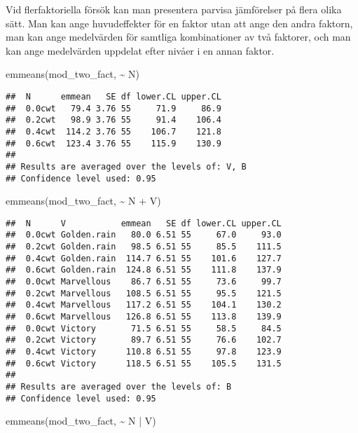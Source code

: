 \documentclass[
]{book}
\newenvironment{Shaded}{\begin{snugshade}}{\end{snugshade}}
\newcommand{\FunctionTok}[1]{\textcolor[rgb]{0.00,0.00,0.00}{#1}}
\newcommand{\NormalTok}[1]{#1}
\newcommand{\SpecialCharTok}[1]{\textcolor[rgb]{0.00,0.00,0.00}{#1}}
\theoremstyle{definition}
\theoremstyle{definition}
\theoremstyle{definition}
\theoremstyle{definition}
\theoremstyle{remark}
\begin{document}
Vid flerfaktoriella försök kan man presentera parvisa jämförelser på flera olika sätt. Man kan ange huvudeffekter för en faktor utan att ange den andra faktorn, man kan ange medelvärden för samtliga kombinationer av två faktorer, och man kan ange medelvärden uppdelat efter nivåer i en annan faktor.

\begin{Shaded}
\begin{Highlighting}[]
\FunctionTok{emmeans}\NormalTok{(mod\_two\_fact, }\SpecialCharTok{\textasciitilde{}}\NormalTok{ N)}
\end{Highlighting}
\end{Shaded}

\begin{verbatim}
##  N      emmean   SE df lower.CL upper.CL
##  0.0cwt   79.4 3.76 55     71.9     86.9
##  0.2cwt   98.9 3.76 55     91.4    106.4
##  0.4cwt  114.2 3.76 55    106.7    121.8
##  0.6cwt  123.4 3.76 55    115.9    130.9
## 
## Results are averaged over the levels of: V, B 
## Confidence level used: 0.95
\end{verbatim}

\begin{Shaded}
\begin{Highlighting}[]
\FunctionTok{emmeans}\NormalTok{(mod\_two\_fact, }\SpecialCharTok{\textasciitilde{}}\NormalTok{ N }\SpecialCharTok{+}\NormalTok{ V)}
\end{Highlighting}
\end{Shaded}

\begin{verbatim}
##  N      V           emmean   SE df lower.CL upper.CL
##  0.0cwt Golden.rain   80.0 6.51 55     67.0     93.0
##  0.2cwt Golden.rain   98.5 6.51 55     85.5    111.5
##  0.4cwt Golden.rain  114.7 6.51 55    101.6    127.7
##  0.6cwt Golden.rain  124.8 6.51 55    111.8    137.9
##  0.0cwt Marvellous    86.7 6.51 55     73.6     99.7
##  0.2cwt Marvellous   108.5 6.51 55     95.5    121.5
##  0.4cwt Marvellous   117.2 6.51 55    104.1    130.2
##  0.6cwt Marvellous   126.8 6.51 55    113.8    139.9
##  0.0cwt Victory       71.5 6.51 55     58.5     84.5
##  0.2cwt Victory       89.7 6.51 55     76.6    102.7
##  0.4cwt Victory      110.8 6.51 55     97.8    123.9
##  0.6cwt Victory      118.5 6.51 55    105.5    131.5
## 
## Results are averaged over the levels of: B 
## Confidence level used: 0.95
\end{verbatim}

\begin{Shaded}
\begin{Highlighting}[]
\FunctionTok{emmeans}\NormalTok{(mod\_two\_fact, }\SpecialCharTok{\textasciitilde{}}\NormalTok{ N }\SpecialCharTok{|}\NormalTok{ V)}
\end{Highlighting}
\end{Shaded}
\end{document}
